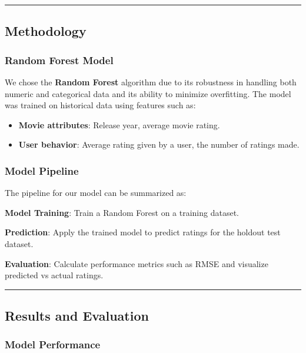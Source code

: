 \documentclass[
]{article}
\begin{document}
\begin{center}\rule{0.5\linewidth}{0.5pt}\end{center}

\subsection{Methodology}\label{methodology}

\subsubsection{Random Forest Model}\label{random-forest-model}

We chose the \textbf{Random Forest} algorithm due to its robustness in
handling both numeric and categorical data and its ability to minimize
overfitting. The model was trained on historical data using features
such as:

\begin{itemize}
\item
  \textbf{Movie attributes}: Release year, average movie rating.
\item
  \textbf{User behavior}: Average rating given by a user, the number of
  ratings made.
\end{itemize}

\subsubsection{Model Pipeline}\label{model-pipeline}

The pipeline for our model can be summarized as:

\textbf{Model Training}: Train a Random Forest on a training dataset.

\textbf{Prediction}: Apply the trained model to predict ratings for the
holdout test dataset.

\textbf{Evaluation}: Calculate performance metrics such as RMSE and
visualize predicted vs actual ratings.

\begin{center}\rule{0.5\linewidth}{0.5pt}\end{center}

\subsection{Results and Evaluation}\label{results-and-evaluation}

\subsubsection{Model Performance}\label{model-performance}
\end{document}
